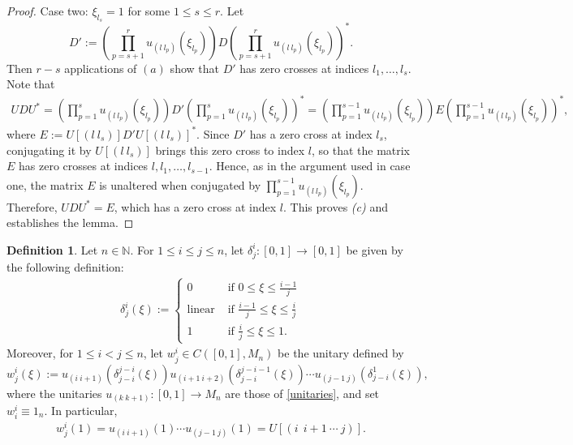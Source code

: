\documentclass[12pt]{amsart}
\numberwithin{equation}{section}
\theoremstyle{definition}
\newtheorem{definition}[theorem]{Definition}
\theoremstyle{remark}
\begin{document}
\begin{proof}
	Case two: $\xi_{l_{s}}=1$ for some $1\leq s\leq r$. Let 
	$$
	D':=\left(\prod_{p=s+1}^{r}u_{(l \ l_{p})}(\xi_{l_{p}})\right)D\left(\prod_{p=s+1}^{r}u_{(l \ l_{p})}(\xi_{l_{p}})\right)^{*}.
	$$
	Then $r-s$ applications of $(a)$ show that $D'$ has zero crosses at indices $l_{1},\ldots,l_{s}$. Note that 
	$$
	\begin{aligned}
	UDU^{*}
	=\left(\prod_{p=1}^{s}u_{(l \ l_{p})}(\xi_{l_{p}})\right)D'\left(\prod_{p=1}^{s}u_{(l \ l_{p})}(\xi_{l_{p}})\right)^{*}
	=\left(\prod_{p=1}^{s-1}u_{(l \ l_{p})}(\xi_{l_{p}})\right)E\left(\prod_{p=1}^{s-1}u_{(l \ l_{p})}(\xi_{l_{p}})\right)^{*},
	\end{aligned}
	$$ 
	where $E:=U[(l \ l_{s})]D'U[(l \ l_{s})]^{*}$. 
	Since $D'$ has a zero cross at index $l_{s}$, conjugating it by $U[(l \ l_{s})]$ brings this zero cross to index $l$, so that the matrix $E$ has zero crosses at indices $l,l_{1},\ldots,l_{s-1}$. Hence, as in the argument used in case one, the matrix $E$ is unaltered when conjugated by $\prod_{p=1}^{s-1}u_{(l \ l_{p})}(\xi_{l_{p}})$. Therefore, $UDU^{*}=E$, which has a zero cross at index $l$. This proves \textit{(c)} and establishes the lemma.
\end{proof}

\begin{definition}
	\label{matrix conjugator}
	Let $n\in\mathbb{N}$. For $1\leq i\leq j\leq n$, let $\delta_{j}^{i}\colon[0,1]\to[0,1]$ be given by the following definition:
	$$
	\begin{aligned}
	\delta_{j}^{i}(\xi):=
	\begin{cases}
	0&\text{ if }0\leq\xi\leq\frac{i-1}{j}\\
	\text{linear}&\text{ if }\frac{i-1}{j}\leq\xi\leq\frac{i}{j}\\
	1&\text{ if }\frac{i}{j}\leq\xi\leq 1. 
	\end{cases}
	\end{aligned}
	$$
	Moreover, for $1\leq i<j\leq n$, let $w_{j}^{i}\in C([0,1],M_{n})$ be the unitary defined by 
	$$
	w_{j}^{i}(\xi):=u_{(i \ i+1)}(\delta_{j-i}^{j-i}(\xi)) u_{(i+1 \ i+2)}(\delta_{j-i}^{j-i-1}(\xi))\cdots u_{(j-1 \ j)}(\delta_{j-i}^{1}(\xi)),
	$$	
	where the unitaries $u_{(k \ k+1)}\colon [0,1]\to M_{n}$ are those of \autoref{unitaries}, and set $w_{i}^{i}\equiv 1_{n}$. In particular, 
	\begin{equation}
	\label{permutation}
	\begin{aligned}
	w_{j}^{i}(1)=u_{(i \ i+1)}(1)\cdots u_{(j-1 \ j)}(1)=U[(i \  \ i+1 \ \cdots \ j)].
	\end{aligned}
	\end{equation}
\end{definition}
\end{document}
